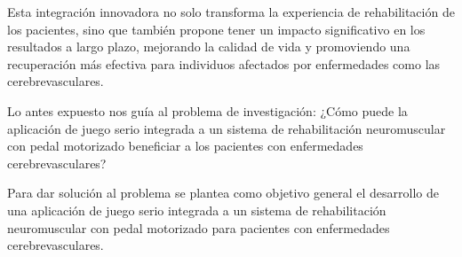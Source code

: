 \begin{introduction}
    \vspace{5pt}
    Esta integración innovadora no solo 
    transforma la experiencia de rehabilitación de los pacientes, sino que también propone tener un impacto 
    significativo en los resultados a largo plazo, mejorando la calidad de vida y promoviendo una recuperación 
    más efectiva para individuos afectados por enfermedades como las cerebrevasculares.

    \vspace{5pt}
    Lo antes expuesto nos guía al problema de investigación: ¿Cómo puede la aplicación de juego serio integrada a un sistema de 
    rehabilitación neuromuscular con pedal motorizado beneficiar a los pacientes con enfermedades cerebrevasculares?

    \vspace{5pt}
    Para dar solución al problema se plantea como objetivo general el desarrollo de una aplicación de juego serio integrada a un sistema de 
    rehabilitación neuromuscular con pedal motorizado para pacientes con enfermedades cerebrevasculares.
    

\end{introduction}

